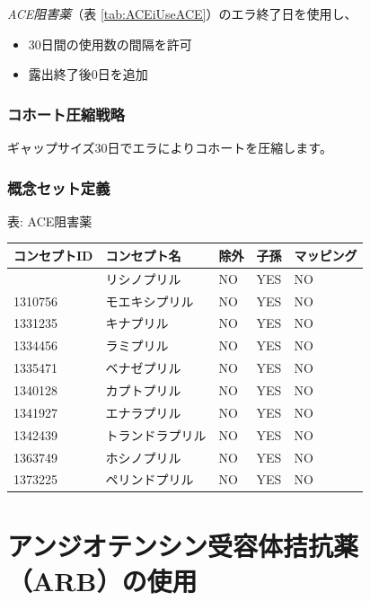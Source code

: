 \documentclass[
  11pt]{book}
\providecommand{\tightlist}{%
  \setlength{\itemsep}{0pt}\setlength{\parskip}{0pt}}
\theoremstyle{definition}
\theoremstyle{definition}
\theoremstyle{definition}
\theoremstyle{definition}
\theoremstyle{remark}
\begin{document}
\emph{ACE阻害薬}（表 \ref{tab:ACEiUseACE}）のエラ終了日を使用し、

\begin{itemize}
\tightlist
\item
  30日間の使用数の間隔を許可
\item
  露出終了後0日を追加
\end{itemize}

\subsubsection*{コホート圧縮戦略}\label{ux30b3ux30dbux30fcux30c8ux5727ux7e2eux6226ux7565-1}

ギャップサイズ30日でエラによりコホートを圧縮します。

\subsubsection*{概念セット定義}\label{ux6982ux5ff5ux30bbux30c3ux30c8ux5b9aux7fa9-1}

表: \label{tab:ACEiUseACE} ACE阻害薬

\begin{longtable}[]{@{}lllll@{}}
\toprule\noalign{}
コンセプトID & コンセプト名 & 除外 & 子孫 & マッピング \\
\midrule\noalign{}
\endhead
\bottomrule\noalign{}
\endlastfoot
1308216 & リシノプリル & NO & YES & NO \\
1310756 & モエキシプリル & NO & YES & NO \\
1331235 & キナプリル & NO & YES & NO \\
1334456 & ラミプリル & NO & YES & NO \\
1335471 & ベナゼプリル & NO & YES & NO \\
1340128 & カプトプリル & NO & YES & NO \\
1341927 & エナラプリル & NO & YES & NO \\
1342439 & トランドラプリル & NO & YES & NO \\
1363749 & ホシノプリル & NO & YES & NO \\
1373225 & ペリンドプリル & NO & YES & NO \\
\end{longtable}

\section{アンジオテンシン受容体拮抗薬（ARB）の使用}\label{ARBUse}
\end{document}
